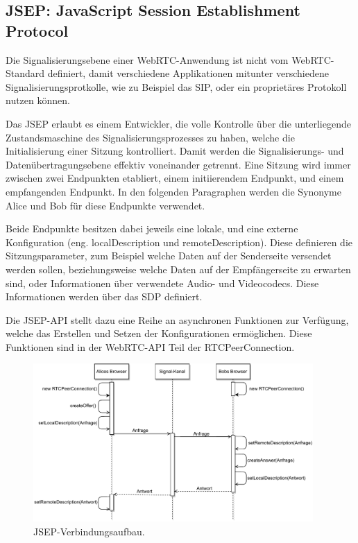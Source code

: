 \subsection{JSEP: JavaScript Session Establishment Protocol}
Die Signalisierungsebene einer \acs{WebRTC}-Anwendung ist nicht vom \acs{WebRTC}-Standard definiert, damit verschiedene Applikationen mitunter verschiedene Signalisierungsprotkolle, wie zu Beispiel das \acf{SIP}, oder ein proprietäres Protokoll nutzen können.\par

Das \acf{JSEP} erlaubt es einem Entwickler, die volle Kontrolle über die unterliegende Zustandsmaschine des Signalisierungsprozesses zu haben, welche die Initialisierung einer Sitzung kontrolliert. Damit werden die Signalisierungs- und Datenübertragungsebene effektiv voneinander getrennt. Eine Sitzung wird immer zwischen zwei Endpunkten etabliert, einem initiierendem Endpunkt, und einem empfangenden Endpunkt. In den folgenden Paragraphen werden die Synonyme \glqq{}Alice\grqq{} und \glqq{}Bob\grqq{} für diese Endpunkte verwendet.\par

Beide Endpunkte besitzen dabei jeweils eine lokale, und eine externe Konfiguration (eng. \glqq{}localDescription\grqq{} und \glqq{}remoteDescription\grqq{}). Diese definieren die Sitzungsparameter, zum Beispiel welche Daten auf der Senderseite versendet werden sollen, beziehungsweise welche Daten auf der Empfängerseite zu erwarten sind, oder Informationen über verwendete Audio- und Videocodecs. Diese Informationen werden über das \acf{SDP} definiert.\par

Die \acs{JSEP}-\acs{API} stellt dazu eine Reihe an asynchronen Funktionen zur Verfügung, welche das Erstellen und Setzen der Konfigurationen ermöglichen. Diese Funktionen sind in der \acs{WebRTC}-\acs{API} Teil der RTCPeerConnection.\par

\begin{figure}[h]
\centering
\includegraphics[width=0.95\textwidth]{bilder/PDF_SVG/JSEP.pdf}
\caption{\acs{JSEP}-Verbindungsaufbau.}
\label{fig:jsep}
\end{figure}

